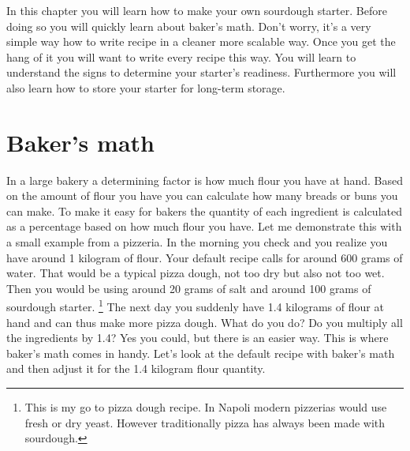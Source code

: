 In this chapter you will learn how to make your
own sourdough starter. Before doing so you will
quickly learn about baker's math. Don't worry,
it's a very simple way how to write recipe in
a cleaner more scalable way. Once you get the hang
of it you will want to write every recipe this way.
You will learn to understand the signs to determine
your starter's readiness.  Furthermore you will
also learn how to store your starter for
long-term storage.

\section{Baker's math}

In a large bakery a determining factor is how
much flour you have at hand. Based on the amount
of flour you have you can calculate how many
breads or buns you can make. To make it easy
for bakers the quantity of each ingredient
is calculated as a percentage based on how much flour you have.
Let me demonstrate this with a small example from
a pizzeria.  In the morning you check and you realize you
have around 1 kilogram of flour.
Your default recipe calls for around 600 grams of water.
That would be a typical pizza dough, not too dry but
also not too wet. Then you would be using around 20 grams
of salt and around 100 grams of sourdough starter.
\footnote{This is my go to pizza dough recipe. In Napoli
modern pizzerias would use fresh or dry yeast. However
traditionally pizza has always been made with sourdough.}
The next day you suddenly have 1.4 kilograms of flour
at hand and can thus make more pizza dough. What do you do?
Do you multiply all the ingredients by 1.4? Yes you could,
but there is an easier way. This is where baker's math
comes in handy. Let's look at the default recipe with baker's
math and then adjust it for the 1.4 kilogram flour quantity.

\begin{table}[H]
\centering
{}
\end{table}

